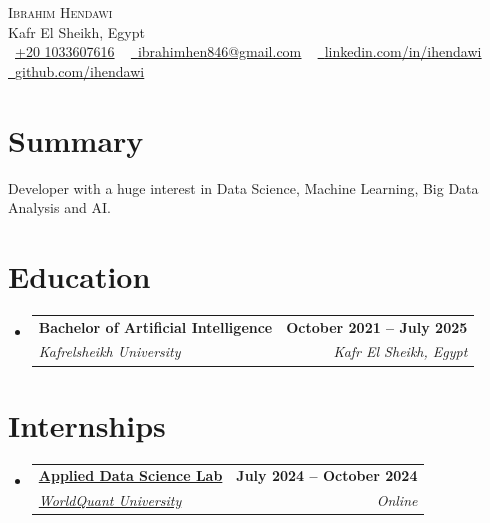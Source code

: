 \documentclass[letterpaper,11pt]{article}
\makeatletter
\newcommand{\resumeSubheading}[4]{
  \vspace{-2pt}\item
    \begin{tabular*}{1.0\textwidth}[t]{l@{\extracolsep{\fill}}r}
      \textbf{#1} & \textbf{\small #2} \\
      \textit{\small#3} & \textit{\small #4} \\
    \end{tabular*}\vspace{-7pt}
}
\newcommand{\resumeSubHeadingListStart}{\begin{itemize}[leftmargin=0.0in, label={}]}
\newcommand{\resumeSubHeadingListEnd}{\end{itemize}}
\makeatother
\begin{document}
\begin{center}


  {\Huge \scshape Ibrahim Hendawi} \\ \vspace{1pt}
  Kafr El Sheikh, Egypt \\ \vspace{1pt}
  \small
  {\raisebox{-0.1\height}
  \faPhone\
  \underline{+20 1033607616}} ~
  \href{mailto:ibrahimhen846@gmail.com}
  {\raisebox{-0.2\height}
  \faEnvelope\
  \underline{ibrahimhen846@gmail.com}} ~
  \href{https://www.linkedin.com/in/ihendawi/}
  {\raisebox{-0.2\height}
  \faLinkedin\
  \underline{linkedin.com/in/ihendawi}}  ~
  \href{https://github.com/ihendawi}
  {\raisebox{-0.2\height}
  \faGithub\
  \underline{github.com/ihendawi}}
  \vspace{-8pt}


\end{center}


\section{Summary}
Developer with a huge interest in Data Science, Machine Learning, Big Data Analysis and AI.


\section{Education}
  \resumeSubHeadingListStart
    \resumeSubheading
      {Bachelor of Artificial Intelligence}{October 2021 -- July 2025}
      {Kafrelsheikh University}{Kafr El Sheikh, Egypt}
  \resumeSubHeadingListEnd


  \vspace{-13pt}


\section{Internships}
  \resumeSubHeadingListStart
    \resumeSubheading
      {\href{https://www.credly.com/badges/53dc8e8f-64e7-4081-8d7c-0b149df635aa}{Applied Data Science Lab}}{July 2024 -- October 2024}
      {\href{https://www.credly.com/organizations/wqu/badges}{WorldQuant University}}{Online}
  \resumeSubHeadingListEnd
  \vspace{-10pt}
\end{document}
